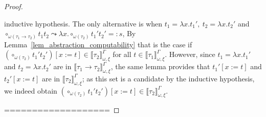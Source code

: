 \documentclass[runningheads,a4paper]{llncs}
\newcommand{\arrnormalise}{\leadsto}
\newcommand{\abs}[2]{\lambda #1.#2}
\newcommand{\val}[3]{\ensuremath{\llbracket#1\rrbracket_{#2}^{#3}}}
\begin{document}
\begin{proof}
\begin{enumerate}
    inductive hypothesis.  The only alternative is when $t_1 =
    \abs{x}{t_1'},\ t_2 = \abs{x}{t_2'}$ and
    $\circ_{\omega(\tau_1\to\tau_2)} t_1 t_2 \arrnormalise
    \abs{x}{\circ_{\omega(\tau_2)} t_1' t_2'} =: s$,
    By Lemma~\ref{lem_abstraction_computability} that is the case if
    $(\circ_{\omega(\tau_2)} t_1' t_2')[x:=t] \in
    \val{\tau_2}{\omega,\xi}{\Gamma}$ for all $t \in \val{\tau_1}{
    \omega,\xi}{\Gamma}$.
    However, since $t_1 = \abs{x}{t_1'}$ and $t_2 = \abs{x}{t_2'}$ are
    in $\val{\tau_1\to\tau_2}{\omega,\xi}{\Gamma}$, the same lemma
    provides that $t_1'[x:=t]$ and $t_2'[x:=t]$ are in
    $\val{\tau_2}{\omega,\xi}{\Gamma}$; as this set is a candidate by
    the inductive hypothesis, we indeed obtain $(\circ_{\omega(\tau_2)}
    t_1' t_2')[x:=t] \in \val{\tau_2}{\omega,\xi}{\Gamma}$.
  \end{enumerate}

    ===================


\end{proof}
\end{document}
